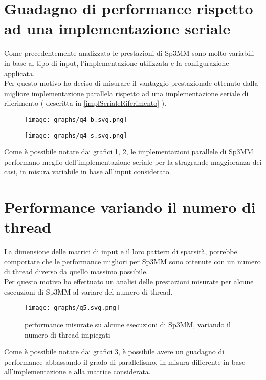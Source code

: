 \section{Guadagno di performance rispetto ad una implementazione seriale} \label{chPerf:allMatrixs}
Come precedentemente analizzato le prestazioni di Sp3MM sono molto variabili in base al tipo di input, 
l'implementazione utilizzata e la configurazione applicata.\\
Per questo motivo ho deciso di misurare il vantaggio prestazionale ottenuto dalla migliore implementazione parallela 
rispetto ad una implementazione seriale di riferimento ( descritta in \ref{implSerialeRiferimento} ).\\
\begin{figure}[H]
  \centering \texttt{[image: graphs/q4-b.svg.png]}
  \decoRule \label{fig:q4big}
\end{figure}
\begin{figure}[H]
  \centering \texttt{[image: graphs/q4-s.svg.png]}
  \decoRule \label{fig:q4small}
\end{figure}
Come è possibile notare dai grafici \ref{fig:q4big}, \ref{fig:q4small}, le implementazioni 
parallele di Sp3MM performano meglio dell'implementazione seriale per la stragrande maggioranza dei casi,
in misura variabile in base all'input considerato.\\

\section{Performance variando il numero di thread}	\label{chPerf:multiThread}
La dimensione delle matrici di input e il loro pattern di sparsità,
potrebbe comportare che le performance migliori per Sp3MM sono ottenute con un numero di thread diverso da quello massimo possibile.\\
Per questo motivo ho effettuato un analisi delle prestazioni misurate per alcune esecuzioni di Sp3MM
al variare del numero di thread.\\
\begin{figure}[H]
  \centering \texttt{[image: graphs/q5.svg.png]}
  \caption{performance misurate su alcune esecuzioni di Sp3MM, variando il numero di thread impiegati}
  \decoRule \label{fig:q5}
\end{figure}
Come è possibile notare dai grafici \ref{fig:q5}, è possibile avere un guadagno di performance 
abbassando il grado di parallelismo, in misura differente in base all'implementazione e alla matrice considerata.\\

